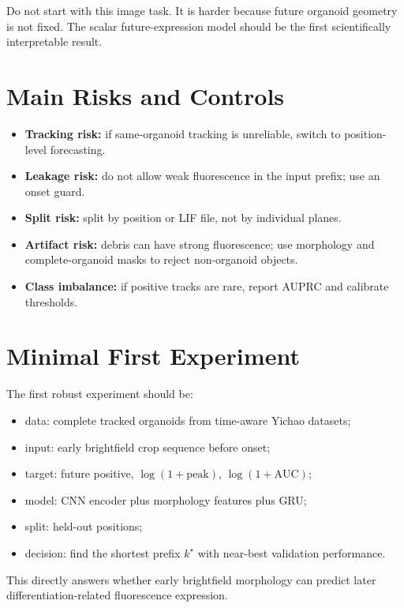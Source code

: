 \documentclass[11pt]{article}
\newcommand{\1}{\mathbf{1}}
\begin{document}
Do not start with this image task. It is harder because future organoid geometry is not fixed. The scalar future-expression model should be the first scientifically interpretable result.

\section{Main Risks and Controls}
\begin{itemize}[leftmargin=1.5em]
  \item \textbf{Tracking risk:} if same-organoid tracking is unreliable, switch to position-level forecasting.
  \item \textbf{Leakage risk:} do not allow weak fluorescence in the input prefix; use an onset guard.
  \item \textbf{Split risk:} split by position or LIF file, not by individual planes.
  \item \textbf{Artifact risk:} debris can have strong fluorescence; use morphology and complete-organoid masks to reject non-organoid objects.
  \item \textbf{Class imbalance:} if positive tracks are rare, report AUPRC and calibrate thresholds.
\end{itemize}

\section{Minimal First Experiment}
The first robust experiment should be:
\begin{itemize}[leftmargin=1.5em]
  \item data: complete tracked organoids from time-aware Yichao datasets;
  \item input: early brightfield crop sequence before onset;
  \item target: future positive, \(\log(1+\mathrm{peak})\), \(\log(1+\mathrm{AUC})\);
  \item model: CNN encoder plus morphology features plus GRU;
  \item split: held-out positions;
  \item decision: find the shortest prefix \(k^\star\) with near-best validation performance.
\end{itemize}

This directly answers whether early brightfield morphology can predict later differentiation-related fluorescence expression.
\end{document}
